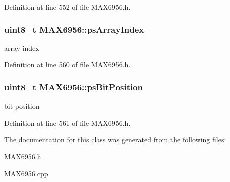 Definition at line 552 of file M\-A\-X6956.\-h.

\hypertarget{classMAX6956_a967e25fac00c0ab59be854289eb36353}{
\subsubsection[{ps\-Array\-Index}]{\setlength{\rightskip}{0pt plus 5cm}uint8\-\_\-t M\-A\-X6956\-::ps\-Array\-Index\hspace{0.3cm}{\ttfamily [private]}}}\label{classMAX6956_a967e25fac00c0ab59be854289eb36353}


array index 



Definition at line 560 of file M\-A\-X6956.\-h.

\hypertarget{classMAX6956_a92b5dc05a1483c49c150db13dcd1f283}{
\subsubsection[{ps\-Bit\-Position}]{\setlength{\rightskip}{0pt plus 5cm}uint8\-\_\-t M\-A\-X6956\-::ps\-Bit\-Position\hspace{0.3cm}{\ttfamily [private]}}}\label{classMAX6956_a92b5dc05a1483c49c150db13dcd1f283}


bit position 



Definition at line 561 of file M\-A\-X6956.\-h.



The documentation for this class was generated from the following files\-:\begin{DoxyCompactItemize}
\item 
\hyperlink{MAX6956_8h}{M\-A\-X6956.\-h}\item 
\hyperlink{MAX6956_8cpp}{M\-A\-X6956.\-cpp}\end{DoxyCompactItemize}
